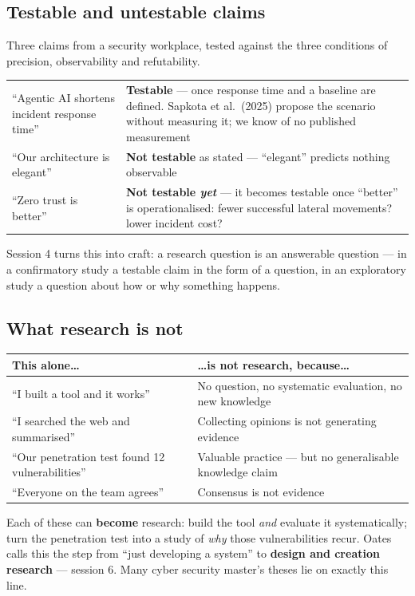 \documentclass[11pt,a4paper,british,twoside=false,headings=small,chapterprefix=false,numbers=noenddot]{scrbook}
\newenvironment{block}[1]{\begin{tcolorbox}[scriptbox, title={#1}]}{\end{tcolorbox}}
\begin{document}
\subsection{Testable and untestable claims}
Three claims from a security workplace, tested against the three conditions of precision, observability and refutability.
\begin{center}\small
\small
  \renewcommand{\arraystretch}{1.5}
  \begin{tabular}{@{}p{6.4cm}p{6.5cm}@{}}
    \toprule
    ``Agentic AI shortens incident response time'' & \textbf{Testable} --- once response time and a baseline are defined. Sapkota et al.\ (2025) propose the scenario without measuring it; we know of no published measurement\\
    ``Our architecture is elegant'' & \textbf{Not testable} as stated --- ``elegant'' predicts nothing observable\\
    ``Zero trust is better'' & \textbf{Not testable \emph{yet}} --- it becomes testable once ``better'' is operationalised: fewer successful lateral movements? lower incident cost?\\
    \bottomrule
  \end{tabular}
  

  {\color{uiagrey}Session 4 turns this into craft: a research question is an
  answerable question --- in a confirmatory study a testable claim in the form
  of a question, in an exploratory study a question about how or why
  something happens.}
\end{center}


\subsection{What research is not}
\begin{center}\small
\small
  \renewcommand{\arraystretch}{1.35}
  \begin{tabular}{@{}p{4.4cm}p{9.2cm}@{}}
    \toprule
    \textbf{This alone\dots} & \textbf{\dots is not research, because\dots}\\
    \midrule
    ``I built a tool and it works'' & No question, no systematic evaluation, no new knowledge\\
    ``I searched the web and summarised'' & Collecting opinions is not generating evidence\\
    ``Our penetration test found 12 vulnerabilities'' & Valuable practice --- but no generalisable knowledge claim\\
    ``Everyone on the team agrees'' & Consensus is not evidence\\
    \bottomrule
  \end{tabular}
  
  \begin{block}{However}
    Each of these can \textbf{become} research: build the tool \emph{and}
    evaluate it systematically; turn the penetration test into a study of
    \emph{why} those vulnerabilities recur. Oates calls this the step from
    ``just developing a system'' to \textbf{design and creation research} ---
    session 6. Many cyber security master's theses lie on exactly this line.
  \end{block}
\end{center}
\end{document}
